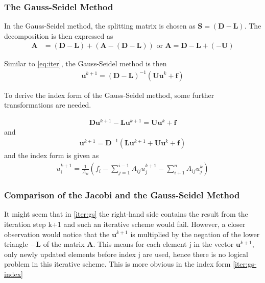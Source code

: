 \subsubsection{The Gauss-Seidel Method}
In the Gauss-Seidel method, the splitting matrix is chosen as $\boldsymbol{S} = (\boldsymbol{D} - \boldsymbol{L})$. The decomposition is then expressed as
\begin{align}
    \boldsymbol{A} &= (\boldsymbol{D} - \boldsymbol{L}) + (\boldsymbol{A} - (\boldsymbol{D} - \boldsymbol{L}))  \text{ or } \boldsymbol{A} = \boldsymbol{D} -\boldsymbol{L} + (- \boldsymbol{U})
\end{align}

Similar to \autoref{eq:iter}, the Gauss-Seidel method is then
\begin{align}
    \boldsymbol{u}^{k+1} = (\boldsymbol{D} - \boldsymbol{L})^{-1}( \boldsymbol{U}\boldsymbol{u}^k + \boldsymbol{f})
\end{align}

To derive the index form of the Gauss-Seidel method, some further transformations are needed.

\begin{align}
    \boldsymbol{D}\boldsymbol{u}^{k+1} - \boldsymbol{L}\boldsymbol{u}^{k+1} = \boldsymbol{U}\boldsymbol{u}^k + \boldsymbol{f}
\end{align}
and
\begin{align}
    \boldsymbol{u}^{k+1} = \boldsymbol{D}^{-1} (\boldsymbol{L}\boldsymbol{u}^{k+1} + \boldsymbol{U}\boldsymbol{u}^{k} + \boldsymbol{f}) 
    \label{iter:gs}
\end{align}
and the index form is given as
\begin{align}
    u_i^{k+1} = \frac{1}{A_{ii}} (f_i - \sum_{j=1}^{i-1}A_{ij}u_j^{k+1} -  \sum_{i+1}^{n}A_{ij}u_j^{k})
    \label{iter:gs-index}
\end{align}

\subsubsection{Comparison of the Jacobi and the Gauss-Seidel Method}
It might seem that in \autoref{iter:gs} the right-hand side contains the result from the iteration step k+1 and such an iterative scheme would fail. However, a closer observation would notice that the $\boldsymbol{u}^{k+1}$ is multiplied by the negation of the lower triangle $-\boldsymbol{L}$ of the matrix $\boldsymbol{A}$. This means for each element j in the vector $\boldsymbol{u}^{k+1}$, only newly updated elements before index j are used, hence there is no logical problem in this iterative scheme. This is more obvious in the index form \autoref{iter:gs-index}

